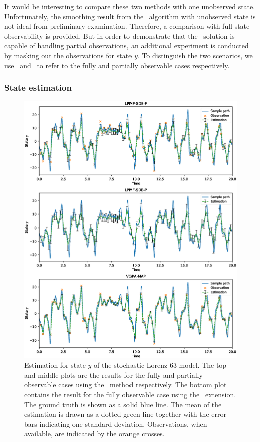It would be interesting to compare these two methods with one unobserved state.
Unfortunately, the smoothing result from the \algovgpa\ algorithm with unobserved state is not ideal from preliminary examination.
Therefore, a comparison with full state observability is provided.
But in order to demonstrate that the \algolpmfsde\ solution is capable of handling partial observations, an additional experiment is conducted by masking out the observations for state $y$.
To distinguish the two scenarios, we use \algolpmfsdef\ and  \algolpmfsdep\ to refer to the fully and partially observable cases respectively.

\subsubsection*{State estimation}

\begin{figure}
    \centering
    \includegraphics[width=\textwidth]{graphics/lorenz-63-states}
    \caption{Estimation for state $y$ of the stochastic Lorenz 63 model. The top and middle plots are the results for the fully and partially observable cases using the \algolpmfsde\ method respectively. The bottom plot contains the result for the fully observable case using the \algovgpamap\ extension. The ground truth is shown as a solid blue line. The mean of the estimation is drawn as a dotted green line together with the error bars indicating one standard deviation. Observations, when available, are indicated by the orange crosses.}
    \label{fig-lorenz-63-states}
\end{figure}

